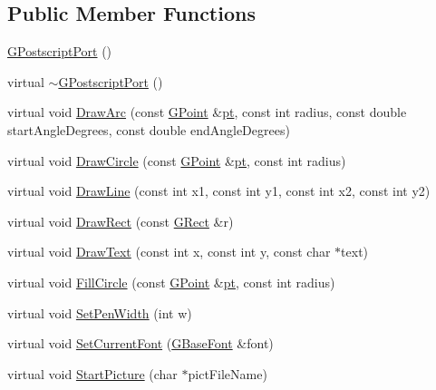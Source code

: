 \subsection*{Public Member Functions}
\begin{DoxyCompactItemize}
\item 
\mbox{\hyperlink{class_g_postscript_port_ad6dc52974d36561520b126452bd12e1f}{G\+Postscript\+Port}} ()
\item 
virtual \mbox{\hyperlink{class_g_postscript_port_ac96c020bd52c420e954e7ea9faf4bc51}{$\sim$\+G\+Postscript\+Port}} ()
\item 
virtual void \mbox{\hyperlink{class_g_postscript_port_a9930f5d5cf8d6efb04af048a3ab72a3f}{Draw\+Arc}} (const \mbox{\hyperlink{class_g_point}{G\+Point}} \&\mbox{\hyperlink{rings_8cpp_af69bbacaaf68a115b351c5d1e29c3cc8}{pt}}, const int radius, const double start\+Angle\+Degrees, const double end\+Angle\+Degrees)
\item 
virtual void \mbox{\hyperlink{class_g_postscript_port_a859f59aeb691f0a9072aacc555417bb5}{Draw\+Circle}} (const \mbox{\hyperlink{class_g_point}{G\+Point}} \&\mbox{\hyperlink{rings_8cpp_af69bbacaaf68a115b351c5d1e29c3cc8}{pt}}, const int radius)
\item 
virtual void \mbox{\hyperlink{class_g_postscript_port_a5f148a471c23fbf49397e17947c426e2}{Draw\+Line}} (const int x1, const int y1, const int x2, const int y2)
\item 
virtual void \mbox{\hyperlink{class_g_postscript_port_a2d69a564e11b54ee7d7878ad83b45707}{Draw\+Rect}} (const \mbox{\hyperlink{class_g_rect}{G\+Rect}} \&r)
\item 
virtual void \mbox{\hyperlink{class_g_postscript_port_abdd3978e13af04f5e6db9cf28cf861a8}{Draw\+Text}} (const int x, const int y, const char $\ast$text)
\item 
virtual void \mbox{\hyperlink{class_g_postscript_port_a802ee0f5b503ec12b1400e4b20725419}{Fill\+Circle}} (const \mbox{\hyperlink{class_g_point}{G\+Point}} \&\mbox{\hyperlink{rings_8cpp_af69bbacaaf68a115b351c5d1e29c3cc8}{pt}}, const int radius)
\item 
virtual void \mbox{\hyperlink{class_g_postscript_port_a63e3cf185f620f9f24ec40f01dc3b02c}{Set\+Pen\+Width}} (int w)
\item 
virtual void \mbox{\hyperlink{class_g_postscript_port_a85705800844e412facdd5a08be9cf46b}{Set\+Current\+Font}} (\mbox{\hyperlink{class_g_base_font}{G\+Base\+Font}} \&font)
\item 
virtual void \mbox{\hyperlink{class_g_postscript_port_a4c9faebb953228964ca032e75ed40bcc}{Start\+Picture}} (char $\ast$pict\+File\+Name)

\end{DoxyCompactItemize}
